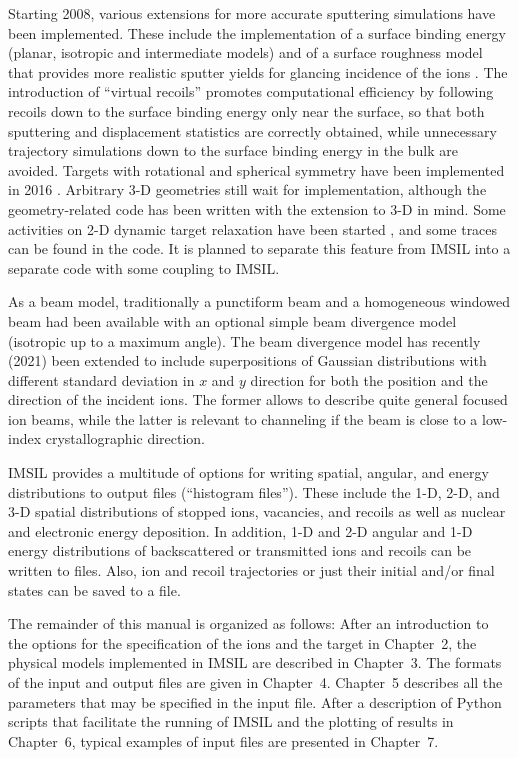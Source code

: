 Starting 2008, various extensions for more accurate sputtering simulations have 
been implemented. These include the implementation of a surface binding energy
(planar, isotropic and intermediate models) \cite{ebm_assessment_2009,
hobler_assessment_2013} and of a surface roughness model that provides more
realistic sputter yields for glancing incidence of the ions
\cite{lindsey_simple_2017}. The introduction of ``virtual recoils''
\cite{hobler_dynamic_2011} promotes computational efficiency by following
recoils down to the surface binding energy only near the surface, so that both
sputtering and displacement statistics are correctly obtained, while unnecessary
trajectory simulations down to the surface binding energy in the bulk are
avoided. Targets with rotational and spherical symmetry have been implemented in
2016 \cite{urbassek_sputtering_2018,bradley_second_2021}.
Arbitrary 3-D geometries still wait for implementation, although the 
geometry-related code has been written with the extension to 3-D in mind.
Some activities on 2-D dynamic target relaxation have been started
\cite{hobler_dynamic_2011,hobler_combined_2015}, and some traces can be found in
the code. It is planned to separate this feature from IMSIL into a separate code
with some coupling to IMSIL. 

As a beam model, traditionally a punctiform beam and a homogeneous windowed beam
had been available with an optional simple beam divergence model (isotropic up
to a maximum angle). The beam divergence model has recently (2021) been
extended to include superpositions of Gaussian distributions with different
standard deviation in $x$ and $y$ direction for both the position and the
direction of the incident ions. The former allows to describe quite general
focused ion beams, while the latter is relevant to channeling if the beam is
close to a low-index crystallographic direction. 

IMSIL provides a multitude of options for writing spatial, angular, and energy 
distributions to output files (``histogram files''). These include the 1-D, 2-D,
and 3-D spatial distributions of stopped ions, vacancies, and recoils as well as
nuclear and electronic energy deposition. In addition, 1-D and 2-D angular and
1-D energy distributions of backscattered or transmitted ions and recoils can be
written to files. Also, ion and recoil trajectories or just their initial and/or
final states can be saved to a file.

The remainder of this manual is organized as follows: After an introduction to
the options for the specification of the ions and the target in Chapter~2, the
physical models implemented in IMSIL are described in Chapter~3. The formats of
the input and output files are given in Chapter~4. Chapter~5 describes all the
parameters that may be specified in the input file.  After a description of
Python scripts that facilitate the running of IMSIL and the plotting of results
in Chapter~6, typical examples of input files are presented in Chapter~7. 

